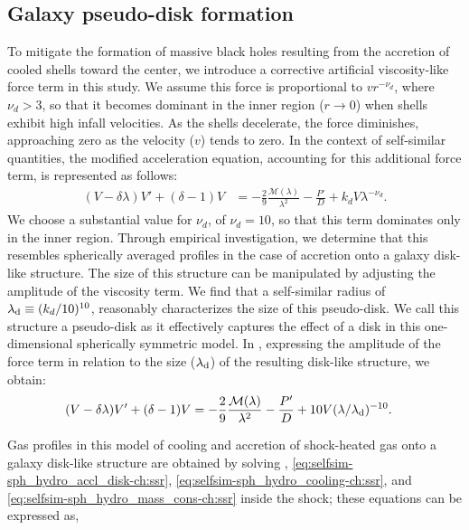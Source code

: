 \subsection{Galaxy pseudo-disk formation}%
To mitigate the formation of massive black holes resulting from the accretion of cooled shells toward the center, we introduce a corrective artificial viscosity-like force term in this study. We assume this force is proportional to $vr^{-\nu_d}$, where $\nu_d>3$, so that it becomes dominant in the inner region ($r \rightarrow 0$) when shells exhibit high infall velocities. As the shells decelerate, the force diminishes, approaching zero as the velocity ($v$) tends to zero. In the context of self-similar quantities, the modified acceleration equation, accounting for this additional force term, is represented as follows:
\begin{align}
\label{eq:selfsim-sph_hydro_accl_disk_gen-ch:ssr}
(V-\delta \lambda) V' + (\delta -1 ) V &= - \frac{2}{9} \frac{\mathcal{M}(\lambda)}{\lambda^2 } - \frac{P'}{D} + k_d V \lambda^{-\nu_d}.
\end{align}
We choose a substantial value for $\nu_d$, of $\nu_d=10$, so that this term dominates only in the inner region. Through empirical investigation, we determine that this resembles spherically averaged profiles in the case of
accretion onto a galaxy disk-like structure. The size of this structure can be manipulated by adjusting the amplitude of the viscosity term. We find that a self-similar radius of $\lambda_{\rm d} \equiv (k_d/10)^{10}$, reasonably characterizes the size of this pseudo-disk. We call this structure a pseudo-disk as it effectively captures the effect of a disk in this one-dimensional spherically symmetric model.  In , expressing the amplitude of the force term in relation to the size ($\lambda_{\rm d}$) of the resulting disk-like structure, we obtain:
\begin{align}
\label{eq:selfsim-sph_hydro_accl_disk-ch:ssr}
(V-\delta \lambda) V' + (\delta -1 ) V &= - \frac{2}{9} \frac{\mathcal{M}(\lambda)}{\lambda^2 } - \frac{P'}{D} + 10V(\lambda/\lambda_{\rm d})^{-10}.
\end{align}

\noindent
Gas profiles in this model of cooling and accretion of shock-heated gas onto a galaxy disk-like structure are obtained by solving , \eqref{eq:selfsim-sph_hydro_accl_disk-ch:ssr}, \eqref{eq:selfsim-sph_hydro_cooling-ch:ssr}, and \eqref{eq:selfsim-sph_hydro_mass_cons-ch:ssr} inside the shock; these equations can be expressed as,

